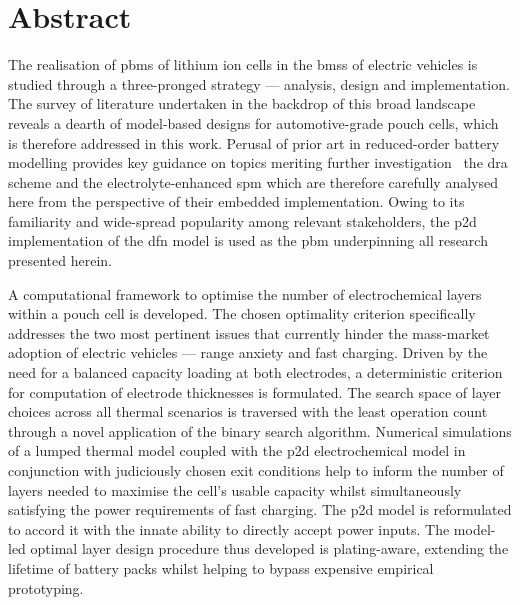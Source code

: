 
\chapter*{Abstract\hfill}

\vspace*{-1cm}

The  realisation of  \glspl{pbm}  of lithium  ion cells  in  the \glspl{bms}  of
electric  vehicles is  studied through  a three-pronged  strategy ---  analysis,
design  and  implementation.   The  survey  of  literature   undertaken  in  the
backdrop of  this broad landscape  reveals a  dearth of model-based  designs for
automotive-grade  pouch  cells,  which  is therefore  addressed  in  this  work.
Perusal of  prior art in  reduced-order battery modelling provides  key guidance
on  topics meriting  further  investigation \viz~the  \gls{dra}  scheme and  the
electrolyte-enhanced \gls{spm} which are  therefore carefully analysed here from
the perspective of  their embedded implementation. Owing to  its familiarity and
wide-spread popularity among relevant stakeholders, the \gls{p2d} implementation
of  the \gls{dfn}  model  is used  as the  \gls{pbm}  underpinning all  research
presented herein.

A  computational framework  to  optimise the  number  of electrochemical  layers
within a pouch  cell is developed. The chosen  optimality criterion specifically
addresses the  two most pertinent  issues that currently hinder  the mass-market
adoption of electric vehicles --- range anxiety and fast charging. Driven by the
need  for  a balanced  capacity  loading  at  both electrodes,  a  deterministic
criterion for  computation of  electrode thicknesses  is formulated.  The search
space of layer choices across all  thermal scenarios is traversed with the least
operation  count through  a novel  application of  the binary  search algorithm.
Numerical  simulations of  a lumped  thermal  model coupled  with the  \gls{p2d}
electrochemical  model in  conjunction with  judiciously chosen  exit conditions
help  to inform  the  number of  layers  needed to  maximise  the cell's  usable
capacity  whilst  simultaneously  satisfying  the  power  requirements  of  fast
charging.  The \gls{p2d}  model is  reformulated to  accord it  with the  innate
ability  to directly  accept power  inputs. The  model-led optimal  layer design
procedure thus  developed is  plating-aware, extending  the lifetime  of battery
packs whilst helping to bypass expensive empirical prototyping.

